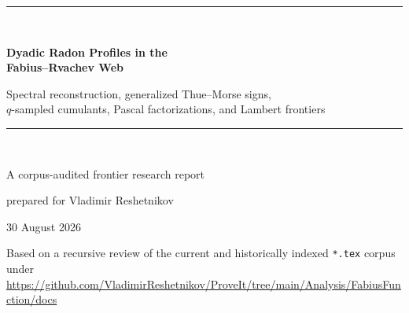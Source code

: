 \documentclass[11pt]{article}
\numberwithin{equation}{section}
\theoremstyle{definition}
\theoremstyle{remark}
\begin{document}
\hypersetup{pageanchor=false}
\begin{titlepage}
\centering
\vspace*{1.1cm}
{\color{navy}\rule{0.84\textwidth}{1.2pt}}\\[0.95cm]
{\Huge\bfseries\color{navy} Dyadic Radon Profiles in the\\[0.16em] Fabius--Rvachev Web\par}
\vspace{0.65cm}
{\Large\color{teal} Spectral reconstruction, generalized Thue--Morse signs,\\
$q$-sampled cumulants, Pascal factorizations, and Lambert frontiers\par}
\vspace{0.95cm}
{\color{navy}\rule{0.84\textwidth}{0.6pt}}\\[1.15cm]
{\large A corpus-audited frontier research report\par}
\vspace{0.25cm}
{\large prepared for Vladimir Reshetnikov\par}
\vfill
{\large 30 August 2026\par}
\vspace{0.55cm}
{\small Based on a recursive review of the current and historically indexed
\texttt{*.tex} corpus under\\[0.25em]
\url{https://github.com/VladimirReshetnikov/ProveIt/tree/main/Analysis/FabiusFunction/docs}\par}
\end{titlepage}
\hypersetup{pageanchor=true}
\end{document}
